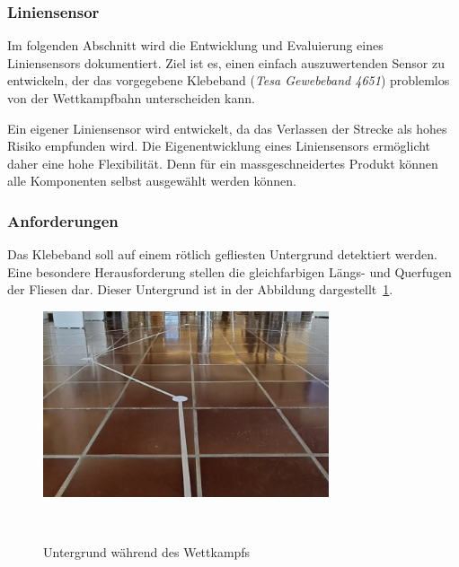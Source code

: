\documentclass[main.tex]{subfiles} %
\begin{document}

\subsubsection{Liniensensor}

Im folgenden Abschnitt wird die Entwicklung und Evaluierung eines Liniensensors
dokumentiert. Ziel ist es, einen einfach auszuwertenden Sensor zu entwickeln,
der das vorgegebene Klebeband (\textit{Tesa Gewebeband 4651}) problemlos von
der Wettkampfbahn unterscheiden kann.

Ein eigener Liniensensor wird entwickelt, da das Verlassen der Strecke als
hohes Risiko empfunden wird. Die Eigenentwicklung eines Liniensensors
ermöglicht daher eine hohe Flexibilität. Denn für ein massgeschneidertes
Produkt können alle Komponenten selbst ausgewählt werden können.

\subsubsection*{Anforderungen}

Das Klebeband soll auf einem rötlich gefliesten Untergrund detektiert werden.
Eine besondere Herausforderung stellen die gleichfarbigen Längs- und Querfugen
der Fliesen dar. Dieser Untergrund ist in der Abbildung
dargestellt~\ref{fig:Untergrund_Wettkampf}.

\begin{figure}[H]
    \centering
    \includegraphics[width=0.75\textwidth]{fig_Strecke_Tracken/Bild_Untergrund.jpg}
    \caption{Untergrund während des Wettkampfs}~\label{fig:Untergrund_Wettkampf}
\end{figure}

\end{document}
